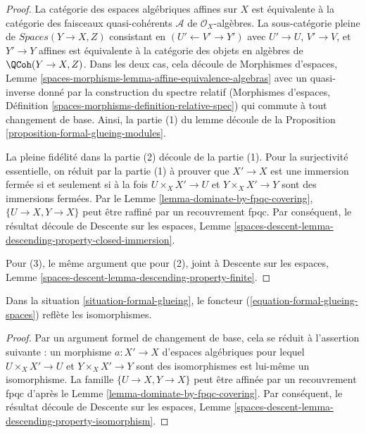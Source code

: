 \begin{proof}
La catégorie des espaces algébriques affines sur $X$ est équivalente à la
catégorie des faisceaux quasi-cohérents $\mathcal{A}$ de $\mathcal{O}_X$-algèbres.
La sous-catégorie pleine de $\textit{Spaces}(Y \to X, Z)$ consistant en
$(U' \leftarrow V' \rightarrow Y')$ avec $U' \to U$, $V' \to V$,
et $Y' \to Y$ affines est équivalente à la catégorie des
objets en algèbres de $\QCoh(Y \to X, Z)$. Dans les deux cas, cela découle
de Morphismes d'espaces, Lemme
\ref{spaces-morphisms-lemma-affine-equivalence-algebras}
avec un quasi-inverse donné par la construction du spectre relatif
(Morphismes d'espaces, Définition
\ref{spaces-morphisms-definition-relative-spec})
qui commute à tout changement de base. Ainsi, la partie (1) du
lemme découle de la Proposition \ref{proposition-formal-glueing-modules}.

\medskip\noindent
La pleine fidélité dans la partie (2) découle de la partie (1). Pour la surjectivité essentielle, on réduit par la partie (1) à prouver que $X' \to X$ est une immersion fermée si et seulement si à la fois $U \times_X X' \to U$ et $Y \times_X X' \to Y$ sont des immersions fermées. Par le Lemme \ref{lemma-dominate-by-fpqc-covering}, $\{U \to X, Y \to X\}$ peut être raffiné par un recouvrement fpqc. Par conséquent, le résultat découle de Descente sur les espaces, Lemme \ref{spaces-descent-lemma-descending-property-closed-immersion}.

\medskip\noindent
Pour (3), le même argument que pour (2), joint à
Descente sur les espaces, Lemme
\ref{spaces-descent-lemma-descending-property-finite}.
\end{proof}

\begin{lemma}
\label{lemma-reflects-isomorphisms}
Dans la situation \ref{situation-formal-glueing}, le foncteur
(\ref{equation-formal-glueing-spaces}) reflète les isomorphismes.
\end{lemma}

\begin{proof}
Par un argument formel de changement de base, cela se réduit à l'assertion suivante : un morphisme $a : X' \to X$ d'espaces algébriques pour lequel $U \times_X X' \to U$ et $Y \times_X X' \to Y$ sont des isomorphismes est lui-même un isomorphisme. La famille $\{U \to X, Y \to X\}$ peut être affinée par un recouvrement fpqc d'après le Lemme \ref{lemma-dominate-by-fpqc-covering}. 
Par conséquent, le résultat découle de
Descente sur les espaces, Lemme \ref{spaces-descent-lemma-descending-property-isomorphism}.
\end{proof}

